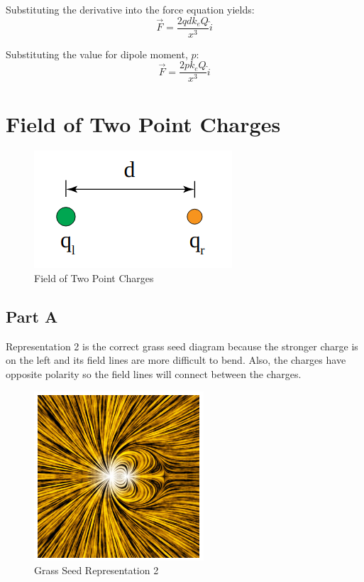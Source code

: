 \documentclass{article}
\begin{document}
Substituting the derivative into the force equation yields:
$$ \vec{F} = \frac{ 2qdk_{e}Q }{ x^{3} } \hat{i} $$

Substituting the value for dipole moment, $p$:
$$ \vec{F} = \frac{ 2pk_{e}Q }{ x^{3} } \hat{i} $$

\section{Field of Two Point Charges}

\begin{figure}[H]
  \centering
  \includegraphics[scale=0.50]{"FieldOfTwoPointCharges"}
  \caption{Field of Two Point Charges}
\end{figure}

\subsection*{Part A}

Representation 2 is the correct grass seed diagram because the stronger charge
is on the left and its field lines are more difficult to bend. Also, the charges
have opposite polarity so the field lines will connect between the charges.

\begin{figure}[H]
  \centering
  \includegraphics[scale=0.75]{"GrassSeedRepresentationTwo"}
  \caption{Grass Seed Representation 2}
\end{figure}
\end{document}

